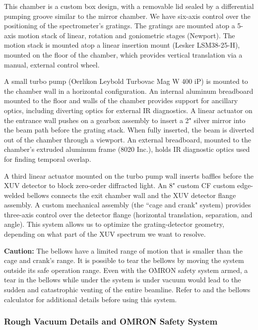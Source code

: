 This chamber is a custom box design, with a removable lid sealed by a differential pumping groove similar to the mirror chamber. We have six-axis control over the positioning of the spectrometer's gratings. The gratings are mounted atop a 5-axis motion stack of linear, rotation and goniometric stages (Newport). The motion stack is mounted atop a linear insertion mount (Lesker LSM38-25-H), mounted on the floor of the chamber, which provides vertical translation via a manual, external control wheel.

A small turbo pump (Oerlikon Leybold Turbovac Mag W 400 iP) is mounted to the chamber wall in a horizontal configuration. An internal aluminum breadboard mounted to the floor and walls of the chamber provides support for ancillary optics, including diverting optics for external IR diagnostics. A linear actuator on the entrance wall pushes on a gearbox assembly to insert a 2" silver mirror into the beam path before the grating stack. When fully inserted, the beam is diverted out of the chamber through a viewport. An external breadboard, mounted to the chamber's extruded aluminum frame (8020 Inc.), holds IR diagnostic optics used for finding temporal overlap.

A third linear actuator mounted on the turbo pump wall inserts baffles before the XUV detector to block zero-order diffracted light. An 8" custom CF custom edge-welded bellows connects the exit chamber wall and the XUV detector flange assembly. A custom mechanical assembly (the ``cage and crank" system) provides three-axis control over the detector flange (horizontal translation, separation, and angle). This system allows us to optimize the grating-detector geometry, depending on what part of the XUV spectrum we want to resolve.

\textbf{Caution:} The bellows have a limited range of motion that is smaller than the cage and crank's range. It is possible to tear the bellows by moving the system outside its safe operation range. Even with the OMRON safety system armed, a tear in the bellows while under the system is under vacuum would lead to the sudden and catastrophic venting of the entire beamline. Refer to \cite{hagemanComplexAttosecondTransientAbsorption2020} and the bellows calculator for additional details before using this system.

\subsubsection{Rough Vacuum Details and OMRON Safety System}
\label{sec:rough_vacuum_details}

